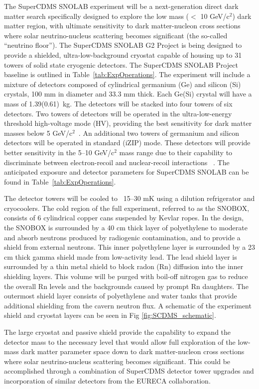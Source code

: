 The SuperCDMS SNOLAB experiment will be a next-generation direct dark matter search specifically designed to explore the low mass ($<$ 10 GeV/c$^{2}$) dark matter region, with ultimate sensitivity to dark matter-nucleon cross sections where solar neutrino-nucleus scattering becomes significant (the so-called “neutrino floor”). The SuperCDMS SNOLAB G2 Project is being designed to provide a shielded, ultra-low-background cryostat capable of housing up to 31 towers of solid state cryogenic detectors.%
The SuperCDMS SNOLAB Project baseline is outlined in Table~\ref{tab:ExpOperations}. The experiment will include a mixture of detectors composed of cylindrical germanium (Ge) and silicon (Si) crystals, 100 mm in diameter and 33.3 mm thick. Each Ge(Si) crystal will have a mass of 1.39(0.61)~kg. The detectors will be stacked into four towers of six detectors. Two towers of detectors will be operated in the ultra-low-energy threshold high-voltage mode (HV), providing the best sensitivity for dark matter masses below 5 GeV/c$^{2}$~\cite{Agnese:2015nto}. An additional two towers of germanium and silicon detectors will be operated in standard (iZIP) mode. These detectors will provide better sensitivity in the 5--10 GeV/c$^{2}$ mass range due to their capability to discriminate between electron-recoil and nuclear-recoil interactions ~\cite{Agnese:2014aze}. The anticipated exposure and detector parameters for SuperCDMS SNOLAB can be found in Table~\ref{tab:ExpOperations}. 

The detector towers will be cooled to ~15--30 mK using a dilution refrigerator and cryocoolers. The cold region of the full experiment, referred to as the SNOBOX, consists of 6 cylindrical copper cans suspended by Kevlar ropes. In the design, the SNOBOX is surrounded by a 40 cm thick layer of polyethylene to moderate and absorb neutrons produced by radiogenic contamination, and to provide a shield from external neutrons. This inner polyethylene layer is surrounded by a 23 cm thick gamma shield made from low-activity lead. The lead shield layer is surrounded by a thin metal shield to block radon (Rn) diffusion into the inner shielding layers. This volume will be purged with boil-off nitrogen gas to reduce the overall Rn levels and the backgrounds caused by prompt Rn daughters. The outermost shield layer consists of polyethylene and water tanks that provide additional shielding from the cavern neutron flux. A schematic of the experiment shield and cryostat layers can be seen in Fig \ref{fig:SCDMS_schematic}. 

The large cryostat and passive shield provide the capability to expand the detector mass to the necessary level that would allow full exploration of the low-mass dark matter parameter space down to dark matter-nucleon cross sections where solar neutrino-nucleus scattering becomes significant. This could be accomplished through a combination of SuperCDMS detector tower upgrades and incorporation of similar detectors from the EURECA collaboration.





